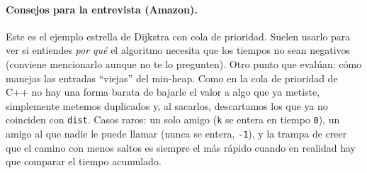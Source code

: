 \paragraph{Consejos para la entrevista (Amazon).} Este es el ejemplo estrella
de Dijkstra con cola de prioridad. Suelen usarlo para ver si entiendes
\emph{por qué} el algoritmo necesita que los tiempos no sean negativos
(conviene mencionarlo aunque no te lo pregunten). Otro punto que evalúan: cómo
manejas las entradas ``viejas'' del min-heap. Como en la cola de prioridad de C++
no hay una forma barata de bajarle el valor a algo que ya metiste, simplemente
metemos duplicados y, al sacarlos, descartamos los que ya no coinciden con
\texttt{dist}. Casos raros: un solo amigo (\texttt{k} se entera en tiempo
\texttt{0}), un amigo al que nadie le puede llamar (nunca se entera,
\texttt{-1}), y la trampa de creer que el camino con menos saltos es siempre
el más rápido cuando en realidad hay que comparar el tiempo acumulado.
